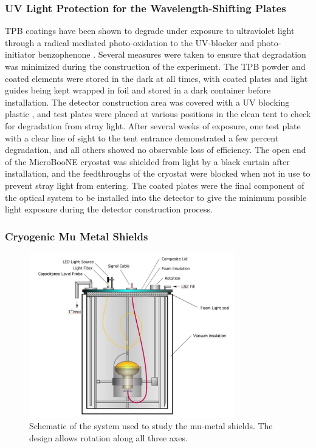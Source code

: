 \subsubsection{UV Light Protection for the Wavelength-Shifting Plates \label{environ}}

TPB coatings have been shown to degrade under exposure to ultraviolet light \cite{Chiu:2012} through a radical mediated photo-oxidation to the UV-blocker and photo-initiator benzophenone \cite{Jones:2013}.  Several measures were taken to ensure that degradation was minimized during the construction of the experiment.  The TPB powder and coated elements were stored in the dark at all times, with coated plates and light guides being kept wrapped in foil and stored in a dark container before installation.  The detector construction area was covered with a UV blocking plastic \cite{LexanThermoclear}, and test plates were placed at various positions in the clean tent to check for degradation from stray light.  After several weeks of exposure, one test plate with a clear line of sight to the tent entrance demonstrated a few percent degradation, and all others showed no observable loss of efficiency. The open end of the MicroBooNE cryostat was shielded from light by a black curtain after installation, and the feedthroughs of the cryostat were blocked when not in use to prevent stray light from entering.  The coated plates were the final component of the optical system to be installed into the detector to give the minimum possible light exposure during the detector construction process.

\subsubsection{Cryogenic Mu Metal Shields}

\begin{figure}[t]
\centering 
\includegraphics[width=0.8\textwidth]{./light_figures/KendzioraRotator.jpg}
\caption{Schematic of the system used to study the mu-metal shields.  The design allows rotation along all three axes. \label{fig:shieldcartoon}  }
\end{figure}



